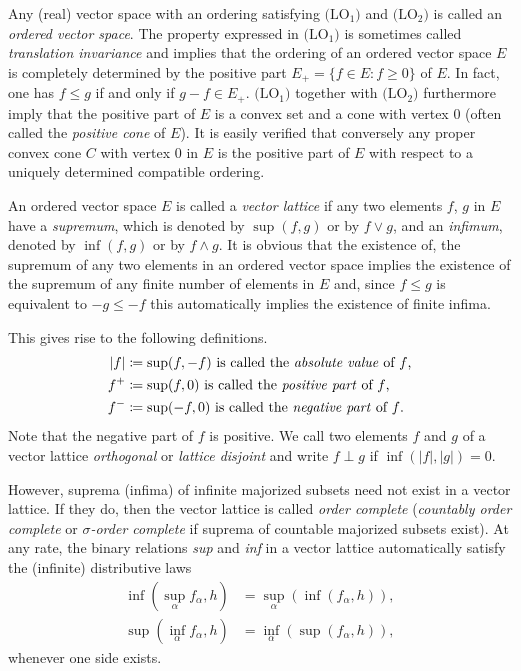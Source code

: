 Any (real) vector space with an ordering satisfying $ \text{(LO$_{1}$)} $ and $ \text{(LO$_{2}$)} $ is called an \emph{ordered vector space}.
The property expressed in $\text{(LO$_{1}$)}$ is sometimes called \emph{translation invariance} and implies that the ordering of an ordered vector space $ E $ is completely determined by the positive part $ E_{+} = \{f \in E \colon f \geq 0\} $ of $ E $.
In fact, one has $ f \leq g $ if and only if $ g - f \in E_{+} $.
$ \text{(LO$_{1}$)} $ together with $ \text{(LO$_{2}$)} $ furthermore imply that the positive part of $ E $ is a convex set and a cone with vertex $ 0 $ (often called the \emph{positive cone} of $ E $).
It is easily verified that conversely any proper convex cone $ C $ with vertex $ 0 $ in $ E $ is the positive part of $ E $ with respect to a uniquely determined compatible ordering.

An ordered vector space $ E $ is called a \emph{vector lattice} if any two elements $ f $, $ g $ in $ E $ have a \emph{supremum}, which is denoted by $ \sup(f,g) $ or by $ f \vee g $, and an \emph{infimum}, denoted by $ \inf(f,g) $ or by $ f \wedge g $.
It is obvious that the existence of, \eg the supremum of any two elements in an ordered vector space implies the existence of the supremum of any finite number of elements in $ E $ and, since $ f \leq g $ is equivalent to $ -g \leq -f $ this automatically implies the existence of finite infima.

This gives rise to the following definitions.
\begin{align*}
	|f| 	& \coloneq \sup(f,-f)  \text{ is called the \emph{absolute value} of $ f $,} \\
	f^{+}	& \coloneq \sup(f,0)   \text{ is called the \emph{positive part} of $ f $,} \\
	f^{-}	& \coloneq \sup(-f,0)  \text{ is called the \emph{negative part} of $ f $.}
\end{align*}
Note that the negative part of $ f $ is positive.
We call two elements $ f $ and $ g $ of a vector lattice \emph{orthogonal} or \emph{lattice disjoint} and write $ f \perp g $ if $ \inf(|f|,|g|) = 0 $.

However, suprema (infima) of infinite majorized subsets need not exist in a vector lattice.
If they do, then the vector lattice is called \emph{order complete} (\emph{countably order complete} or \emph{$ \sigma $-order complete} if suprema of countable majorized subsets exist).
At any rate, the binary relations \emph{sup} and \emph{inf} in a vector lattice automatically satisfy the (infinite) distributive laws
\begin{align*}
\inf(\sup_{\alpha}f_{\alpha},h) & = \sup_{\alpha}(\inf(f_{\alpha},h)), \\
\sup(\inf_{\alpha}f_{\alpha},h) & = \inf_{\alpha}(\sup(f_{\alpha},h)),
\end{align*}
whenever one side exists.

